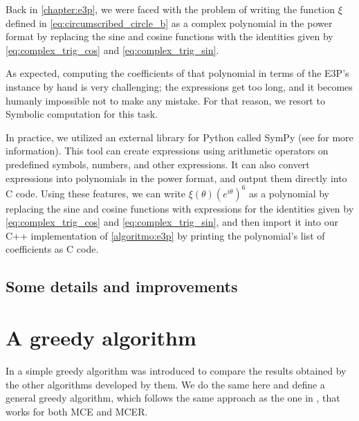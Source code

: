 Back in \autoref{chapter:e3p}, we were faced with the problem of writing the function $\xi$ defined in \autoref{eq:circumscribed_circle_b} as a complex polynomial in the power format by replacing the sine and cosine functions with the identities given by  \autoref{eq:complex_trig_cos} and \autoref{eq:complex_trig_sin}.

As expected, computing the coefficients of that polynomial in terms of the E3P's instance by hand is very challenging; the expressions get too long, and it becomes humanly impossible not to make any mistake. 
For that reason, we resort to Symbolic computation for this task.

In practice, we utilized an external library for Python called SymPy (see  for more information).
This tool can create expressions using arithmetic operators on predefined symbols, numbers, and other expressions. It can also convert expressions into polynomials in the power format, and output them directly into C code. Using these features, we can write $\xi(\theta)(e^{i\theta})^6$ as a polynomial by replacing the sine and cosine functions with expressions for the identities given by  \autoref{eq:complex_trig_cos} and \autoref{eq:complex_trig_sin}, and then import it into our C++ implementation of \autoref{algoritmo:e3p} by printing the polynomial's list of coefficients as C code.


\subsection{Some details and improvements}

\section{A greedy algorithm}

In  a simple greedy algorithm was introduced to compare the results obtained by the other algorithms developed by them. We do the same here and define a general greedy algorithm, which follows the same approach as the one in , that works for both MCE and MCER.

